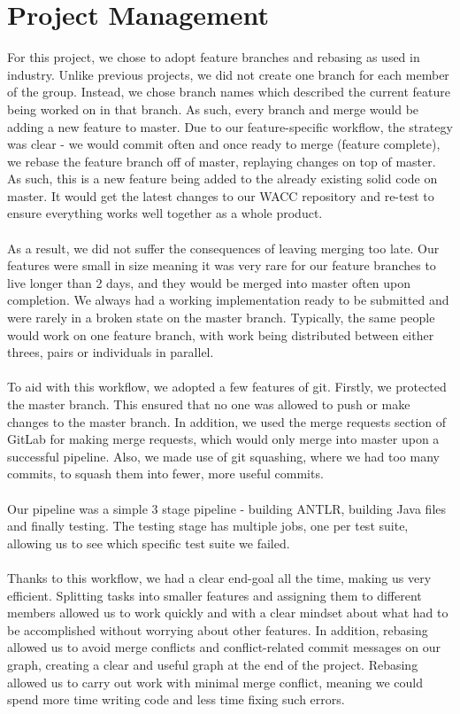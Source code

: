 \documentclass[5pt]{article}
\begin{document}
\section{Project Management}
For this project, we chose to adopt feature branches and rebasing as used in industry. Unlike previous projects, we did not create one branch for each member of the group. Instead, we chose branch names which described the current feature being worked on in that branch. As such, every branch and merge would be adding a new feature to master. Due to our feature-specific workflow, the strategy was clear - we would commit often and once ready to merge (feature complete), we rebase the feature branch off of master, replaying changes on top of master. As such, this is a new feature being added to the already existing solid code on master. It would get the latest changes to our WACC repository and re-test to ensure everything works well together as a whole product.
\\ \\
As a result, we did not suffer the consequences of leaving merging too late. Our features were small in size meaning it was very rare for our feature branches to live longer than 2 days, and they would be merged into master often upon completion. We always had a working implementation ready to be submitted and were rarely in a broken state on the master branch. Typically, the same people would work on one feature branch, with work being distributed between either threes, pairs or individuals in parallel.
\\ \\
To aid with this workflow, we adopted a few features of git. Firstly, we protected the master branch. This ensured that no one was allowed to push or make changes to the master branch. In addition, we used the merge requests section of GitLab for making merge requests, which would only merge into master upon a successful pipeline. Also, we made use of git squashing, where we had too many commits, to squash them into fewer, more useful commits.
\\ \\
Our pipeline was a simple 3 stage pipeline - building ANTLR, building Java files and finally testing. The testing stage has multiple jobs, one per test suite, allowing us to see which specific test suite we failed.
\\ \\
Thanks to this workflow, we had a clear end-goal all the time, making us very efficient. Splitting tasks into smaller features and assigning them to different members allowed us to work quickly and with a clear mindset about what had to be accomplished without worrying about other features. In addition, rebasing allowed us to avoid merge conflicts and conflict-related commit messages on our graph, creating a clear and useful graph at the end of the project. Rebasing allowed us to carry out work with minimal merge conflict, meaning we could spend more time writing code and less time fixing such errors.
\end{document}

